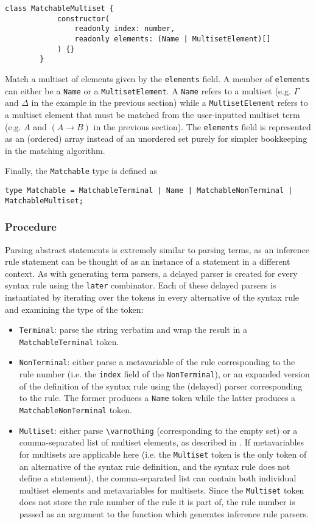 \begin{itemize}
\begin{lstlisting}[style=ds]
        class MatchableMultiset {
            constructor(
                readonly index: number,
                readonly elements: (Name | MultisetElement)[]
            ) {}
        }
    \end{lstlisting}
    Match a multiset of elements given by the \lstinline{elements} field. A member of \lstinline{elements} can either be a \lstinline{Name} or a \lstinline{MultisetElement}. A \lstinline{Name} refers to a multiset (e.g. $\Gamma$ and $\Delta$ in the example in the previous section) while a \lstinline{MultisetElement} refers to a multiset element that must be matched from the user-inputted multiset term (e.g. $A$ and $(A \to B)$ in the previous section). The \lstinline{elements} field is represented as an (ordered) array instead of an unordered set purely for simpler bookkeeping in the matching algorithm.
\end{itemize}
Finally, the \lstinline{Matchable} type is defined as
\begin{center}
    \lstinline{type Matchable = MatchableTerminal | Name | MatchableNonTerminal | MatchableMultiset;}
\end{center}
\subsubsection{Procedure}
Parsing abstract statements is extremely similar to parsing terms, as an inference rule statement can be thought of as an instance of a statement in a different context. As with generating term parsers, a delayed parser is created  for every syntax rule using the \lstinline{later} combinator. Each of these delayed parsers is instantiated by iterating over the tokens in every alternative of the syntax rule and examining the type of the token:
\begin{itemize}
    \item \lstinline{Terminal}: parse the string verbatim and wrap the result in a \lstinline{MatchableTerminal} token.
    \item \lstinline{NonTerminal}: either parse a metavariable of the rule corresponding to the rule number (i.e. the \lstinline{index} field of the \lstinline{NonTerminal}), or an expanded version of the definition of the syntax rule using the (delayed) parser corresponding to the rule. The former produces a \lstinline{Name} token while the latter produces a \lstinline{MatchableNonTerminal} token.
    \item \lstinline{Multiset}: either parse \lstinline{\varnothing} (corresponding to the empty set) or a comma-separated list of multiset elements, as described in . If metavariables for multisets are applicable here (i.e. the \lstinline{Multiset} token is the only token of an alternative of the syntax rule definition, and the syntax rule does not define a statement), the comma-separated list can contain both individual multiset elements and metavariables for multisets. Since the \lstinline{Multiset} token does not store the rule number of the rule it is part of, the rule number is passed as an argument to the function which generates inference rule parsers.
\end{itemize}